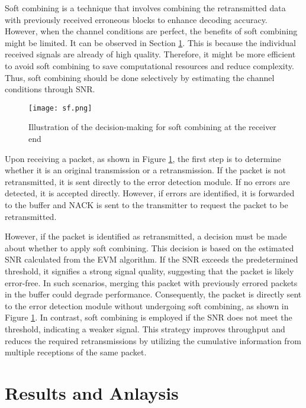 \documentclass[sn-mathphys-num]{sn-jnl}
\theoremstyle{thmstyleone}
\theoremstyle{thmstyletwo}%
\theoremstyle{thmstylethree}%
\begin{document}
Soft combining is a technique that involves combining the retransmitted data with previously received erroneous blocks to enhance decoding accuracy. However, when the channel conditions are perfect, the benefits of soft combining might be limited. It can be observed in Section \ref{s4}. This is because the individual received signals are already of high quality. Therefore, it might be more efficient to avoid soft combining to save computational resources and reduce complexity. Thus, soft combining should be done selectively by estimating the channel conditions through SNR.

\begin{figure}[H]
    \centering
    \texttt{[image: sf.png]}
    \caption{ Illustration of the decision-making for soft combining at the receiver end}
    \label{fig:8}
\end{figure}

Upon receiving a packet, as shown in Figure \ref{fig:8}, the first step is to determine whether it is an original transmission or a retransmission. If the packet is not retransmitted, it is sent directly to the error detection module. If no errors are detected, it is accepted directly. However, if errors are identified, it is forwarded to the buffer and NACK is sent to the transmitter to request the packet to be retransmitted. 

However, if the packet is identified as retransmitted, a decision must be made about whether to apply soft combining. This decision is based on the estimated SNR calculated from the EVM algorithm. If the SNR exceeds the predetermined threshold, it signifies a strong signal quality, suggesting that the packet is likely error-free. In such scenarios, merging this packet with previously errored packets in the buffer could degrade performance. Consequently, the packet is directly sent to the error detection module without undergoing soft combining, as shown in Figure \ref{fig:8}. In contrast, soft combining is employed if the SNR does not meet the threshold, indicating a weaker signal. This strategy improves throughput and reduces the required retransmissions by utilizing the cumulative information from multiple receptions of the same packet.

\section{Results and Anlaysis} \label{s4}
\end{document}
